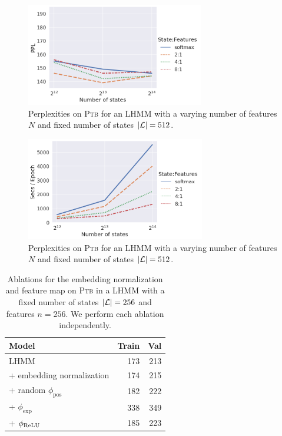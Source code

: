 \documentclass{article}
\begin{document}
\begin{figure}[t]
\centering
\includegraphics[height=4.5cm]{imgs/hmm/lhmm-states-features-dropout.png}
\caption{
\label{fig:hmm-ppl-features}
Perplexities on \textsc{Ptb} for an LHMM with a varying number of features $N$ and fixed number of states $|\mathcal{L}|=512$.
}
\end{figure}

\begin{figure}[t]
\centering
\includegraphics[height=4.5cm]{imgs/hmm/lhmm-states-features-speed.png}
\caption{
\label{fig:hmm-ppl-features}
Perplexities on \textsc{Ptb} for an LHMM with a varying number of features $N$ and fixed number of states $|\mathcal{L}|=512$.
}
\end{figure}

\begin{table}[!t]
\centering
\begin{tabular}{lrr}
\toprule
Model & Train & Val \\
\midrule
LHMM                         & 173 & 213\\
\quad + embedding normalization      & 174 & 215 \\
\quad + random $\phi_\textrm{pos}$ & 182 & 222\\
\quad + $\phi_{\exp}$              & 338 & 349\\
\quad + $\phi_{\mathrm{ReLU}}$               & 185 & 223\\
\bottomrule
\end{tabular}
\caption{\label{tbl:hmm-ablation}
Ablations for the embedding normalization and feature map on \textsc{Ptb} in a LHMM with a fixed number of states $|\mathcal{L}| = 256$ and features $n=256$.
We perform each ablation independently.
}
\end{table}
\end{document}
